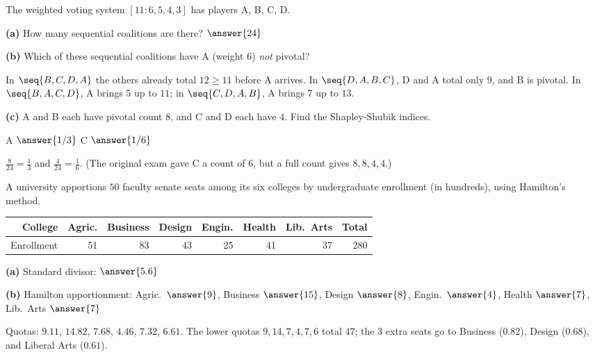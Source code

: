\documentclass[12pt]{ximera}
\begin{document}
\begin{problem}
The weighted voting system $[11:6,5,4,3]$ has players A, B, C, D.

\begin{prompt}
\textbf{(a)} How many sequential coalitions are there? $\answer{24}$
\end{prompt}

\begin{prompt}
\textbf{(b)} Which of these sequential coalitions have A (weight $6$) \emph{not}
pivotal?
\begin{selectAll}
\end{selectAll}
\begin{feedback}
In $\seq{B,C,D,A}$ the others already total $12\ge11$ before A arrives. In
$\seq{D,A,B,C}$, D and A total only $9$, and B is pivotal. In $\seq{B,A,C,D}$, A brings $5$
up to $11$; in $\seq{C,D,A,B}$, A brings $7$ up to $13$.
\end{feedback}
\end{prompt}

\begin{prompt}
\textbf{(c)} A and B each have pivotal count $8$, and C and D each have $4$. Find the
Shapley-Shubik indices.

A $\answer{1/3}$ \quad C $\answer{1/6}$
\begin{feedback}
$\frac8{24}=\frac13$ and $\frac4{24}=\frac16$. (The original exam gave C a count of $6$,
but a full count gives $8,8,4,4$.)
\end{feedback}
\end{prompt}
\end{problem}

\begin{problem}
A university apportions $50$ faculty senate seats among its six colleges by
undergraduate enrollment (in hundreds), using Hamilton's method.
\begin{center}
\begin{tabular}{r|rrrrrr|r}
College & Agric. & Business & Design & Engin. & Health & Lib.\ Arts & Total\\\hline
Enrollment & 51 & 83 & 43 & 25 & 41 & 37 & 280
\end{tabular}
\end{center}

\begin{prompt}
\textbf{(a)} Standard divisor: $\answer{5.6}$
\end{prompt}

\begin{prompt}
\textbf{(b)} Hamilton apportionment: Agric.\ $\answer{9}$, Business $\answer{15}$,
Design $\answer{8}$, Engin.\ $\answer{4}$, Health $\answer{7}$, Lib.\ Arts $\answer{7}$
\begin{feedback}
Quotas: $9.11$, $14.82$, $7.68$, $4.46$, $7.32$, $6.61$. The lower quotas
$9,14,7,4,7,6$ total $47$; the $3$ extra seats go to Business ($0.82$), Design ($0.68$),
and Liberal Arts ($0.61$).
\end{feedback}
\end{prompt}
\end{problem}
\end{document}
